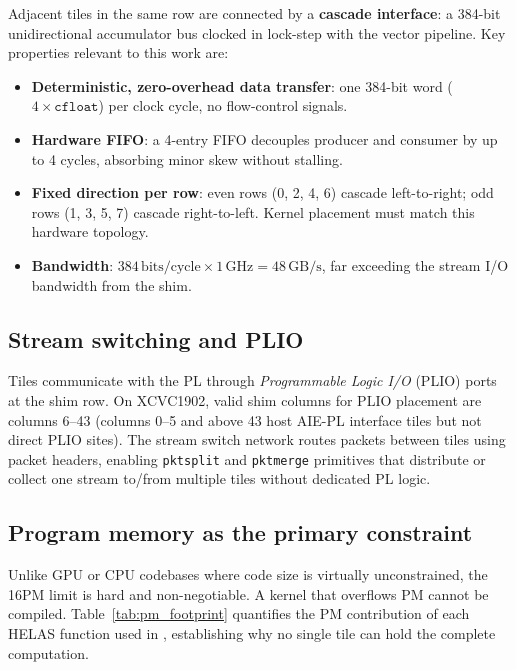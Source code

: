 Adjacent tiles in the same row are connected by a \textbf{cascade interface}:
a 384-bit unidirectional accumulator bus clocked in lock-step with the vector
pipeline.  Key properties relevant to this work are:
\begin{itemize}
  \item \textbf{Deterministic, zero-overhead data transfer}: one 384-bit word
    ($4\times\texttt{cfloat}$) per clock cycle, no flow-control signals.
  \item \textbf{Hardware FIFO}: a 4-entry FIFO decouples producer and consumer
    by up to 4 cycles, absorbing minor skew without stalling.
  \item \textbf{Fixed direction per row}: even rows (0, 2, 4, 6) cascade
    left-to-right; odd rows (1, 3, 5, 7) cascade right-to-left.  Kernel
    placement must match this hardware topology.
  \item \textbf{Bandwidth}: $384\,\text{bits}/\text{cycle} \times 1\,\text{GHz}
    = 48\,\text{GB/s}$, far exceeding the stream I/O bandwidth from the shim.
\end{itemize}

\subsection{Stream switching and PLIO}

Tiles communicate with the PL through \emph{Programmable Logic I/O} (PLIO)
ports at the shim row.  On XCVC1902, valid shim columns for PLIO placement are
columns 6--43 (columns 0--5 and above 43 host AIE-PL interface tiles but not
direct PLIO sites).  The stream switch network routes packets between tiles
using packet headers, enabling \texttt{pktsplit} and \texttt{pktmerge}
primitives that distribute or collect one stream to/from multiple tiles without
dedicated PL logic.

\subsection{Program memory as the primary constraint}

Unlike GPU or CPU codebases where code size is virtually unconstrained, the
16\KB PM limit is hard and non-negotiable.  A kernel that overflows PM cannot
be compiled.  Table~\ref{tab:pm_footprint} quantifies the PM contribution of
each HELAS function used in \ggttg, establishing why no single tile can hold
the complete computation.

